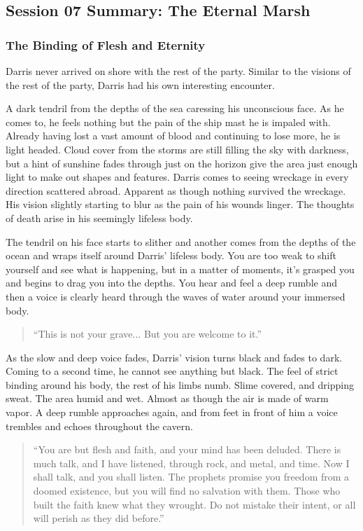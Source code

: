 \subsection{Session 07 Summary: The Eternal Marsh}

\subsubsection{The Binding of Flesh and Eternity}

Darris never arrived on shore with the rest of the party. Similar to the visions of the rest of the party, Darris had his own interesting encounter.

A dark tendril from the depths of the sea caressing his unconscious face. As he comes to, he feels nothing but the pain of the ship mast he is impaled with. Already having lost a vast amount of blood and continuing to lose more, he is light headed. Cloud cover from the storms are still filling the sky with darkness, but a hint of sunshine fades through just on the horizon give the area just enough light to make out shapes and features. Darris comes to seeing wreckage in every direction scattered abroad. Apparent as though nothing survived the wreckage. His vision slightly starting to blur as the pain of his wounds linger. The thoughts of death arise in his seemingly lifeless body.

The tendril on his face starts to slither and another comes from the depths of the ocean and wraps itself around Darris' lifeless body. You are too weak to shift yourself and see what is happening, but in a matter of moments, it's grasped you and begins to drag you into the depths. You hear and feel a deep rumble and then a voice is clearly heard through the waves of water around your immersed body.

\begin{quote}
	``This is not your grave... But you are welcome to it.''
\end{quote}

As the slow and deep voice fades, Darris' vision turns black and fades to dark. Coming to a second time, he cannot see anything but black. The feel of strict binding around his body, the rest of his limbs numb. Slime covered, and dripping sweat. The area humid and wet. Almost as though the air is made of warm vapor. A deep rumble approaches again, and from feet in front of him a voice trembles and echoes throughout the cavern. 

\begin{quote}
	``You are but flesh and faith, and your mind has been deluded. There is much talk, and I have listened, through rock, and metal, and time. Now I shall talk, and you shall listen. The prophets promise you freedom from a doomed existence, but you will find no salvation with them. Those who built the faith knew what they wrought. Do not mistake their intent, or all will perish as they did before.''
\end{quote}
	
